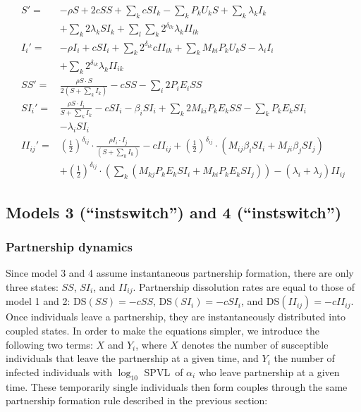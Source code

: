 \documentclass[10pt,letterpaper]{article}
\newcommand{\khalf}{\left(\frac{1}{2}\right)^{\delta_{ij}}}  %
\newcommand{\Lspvl}{$\log_{10}$ SPVL}
\newcommand{\DS}{\textrm{DS}}
\begin{document}
\begin{equation}
\begin{aligned}
S' =& - \rho S + 2 c SS + \sum_k c SI_k - \sum_k P_k U_k S + \sum_k \lambda_k I_k \\
&+ \sum_k 2 \lambda_k SI_k + \sum_l \sum_k  2^{\delta_{lk}} \lambda_k II_{lk}\\
I_i' =&  - \rho I_i + c SI_i + \sum_k 2^{\delta_{ik}} c  II_{ik} + \sum_k M_{ki} P_k U_k S- \lambda_i I_i \\
&+ \sum_k 2^{\delta_{ik}} \lambda_k II_{ik} \\
SS' =& \frac{\rho S \cdot S}{2 (S + \sum_k I_k)} - c SS - \sum_i 2 P_i E_i SS \\
SI_i' =& \frac{\rho S \cdot I_i}{S + \sum_k I_k} - c SI_i - \beta_i SI_i + \sum_k 2 M_{ki} P_k E_k SS - \sum_k P_k E_k SI_i   \\
&- \lambda_i SI_i\\
II_{ij}' =& \khalf \cdot \frac{\rho I_i \cdot I_j}{(S + \sum_k I_k)} - c II_{ij} + \khalf \cdot (M_{ij} \beta_i SI_i + M_{ji} \beta_j SI_j) \\
&+ \khalf \cdot (\sum_k (M_{kj} P_k E_k SI_i + M_{ki} P_k E_k SI_j)) -(\lambda_i + \lambda_j) II_{ij}
\end{aligned}
\end{equation}

\subsection*{Models 3 (``instswitch'') and 4 (``instswitch'')}
\subsubsection*{Partnership dynamics}

Since model 3 and 4 assume instantaneous partnership formation, there are only three states: $SS$, $SI_i$, and $II_{ij}$. Partnership dissolution rates are equal to those of model 1 and 2: $\DS(SS) = -cSS$, $\DS(SI_i) = - cSI_i$, and $\DS(II_{ij}) = - c II_{ij}$. Once individuals leave a partnership, they are instantaneously distributed into coupled states. In order to make the equations simpler, we introduce the following two terms: $X$ and $Y_i$, where $X$ denotes the number of susceptible individuals that leave the partnership at a given time, and $Y_i$ the number of infected individuals with \Lspvl\ of $\alpha_i$ who leave partnership at a given time. These temporarily single individuals then form couples through the same partnership formation rule described in the previous section:
\end{document}
